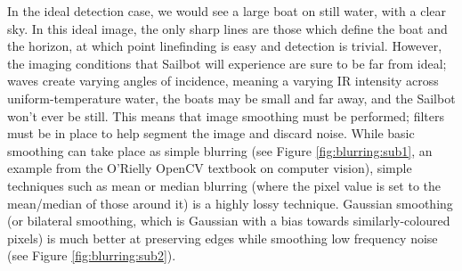 In the ideal detection case, we would see a large boat on still water, with a clear sky. In this ideal image, the only sharp lines are those which define the boat and the horizon, at which point linefinding is easy and detection is trivial. However, the imaging conditions that Sailbot will experience are sure to be far from ideal; waves create varying angles of incidence, meaning a varying IR intensity across uniform-temperature water, the boats may be small and far away, and the Sailbot won't ever be still. This means that image smoothing must be performed; filters must be in place to help segment the image and discard noise. While basic smoothing can take place as simple blurring (see Figure \ref{fig:blurring:sub1}, an example from the O'Rielly OpenCV textbook on computer vision), simple techniques such as mean or median blurring (where the pixel value is set to the mean/median of those around it) is a highly lossy technique. Gaussian smoothing (or bilateral smoothing, which is Gaussian with a bias towards similarly-coloured pixels) is much better at preserving edges while smoothing low frequency noise (see Figure \ref{fig:blurring:sub2}).


